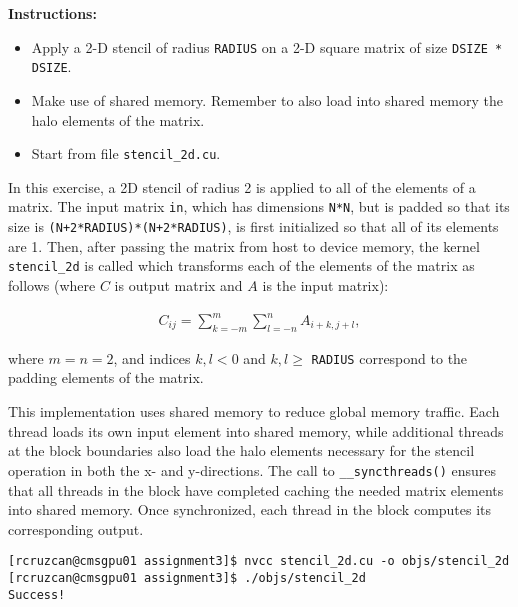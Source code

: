 \documentclass{article}
\newcounter{exercise}
\newenvironment{exr}[1]{%
    \refstepcounter{exercise}
    \begin{tcolorbox}[colback=blue!5!white, colframe=blue!75!black, title=Exercise \theexercise]
    \textbf{Instructions:} #1
    \end{tcolorbox}
    \vspace{1em}
}{}
\begin{document}
\begin{exr}{
    \begin{itemize}
        \item Apply a 2-D stencil of radius \texttt{RADIUS} on a 2-D square matrix of size \texttt{DSIZE * DSIZE}. 
        \item Make use of shared memory. Remember to also load into shared memory the halo elements of the matrix.
        \item Start from file \texttt{stencil\_2d.cu}.
    \end{itemize}   
}\end{exr}

In this exercise, a 2D stencil of radius 2 is applied to all of the elements of a matrix. The input matrix \texttt{in}, which has dimensions \texttt{N*N}, but is padded so that its size is \texttt{(N+2*RADIUS)*(N+2*RADIUS)}, is first initialized so that all of its elements are 1. Then, after passing the matrix from host to device memory, the kernel \texttt{stencil\_2d} is called which transforms each of the elements of the matrix as follows (where $C$ is output matrix and $A$ is the input matrix):

\begin{align*}
    C_{ij} = \sum_{k=-m}^m \sum_{l=-n}^n A_{i+k,j+l},
\end{align*}

\noindent where $m=n=2$, and indices $k,l < 0$ and $k,l \geq$ \texttt{RADIUS} correspond to the padding elements of the matrix.

This implementation uses shared memory to reduce global memory traffic. Each thread loads its own input element into shared memory, while additional threads at the block boundaries also load the halo elements necessary for the stencil operation in both the x- and y-directions. The call to \texttt{\_\_syncthreads()} ensures that all threads in the block have completed caching the needed matrix elements into shared memory. Once synchronized, each thread in the block computes its corresponding output.



\begin{lstlisting}[style=output]
[rcruzcan@cmsgpu01 assignment3]$ nvcc stencil_2d.cu -o objs/stencil_2d 
[rcruzcan@cmsgpu01 assignment3]$ ./objs/stencil_2d 
Success!
\end{lstlisting}
\end{document}
